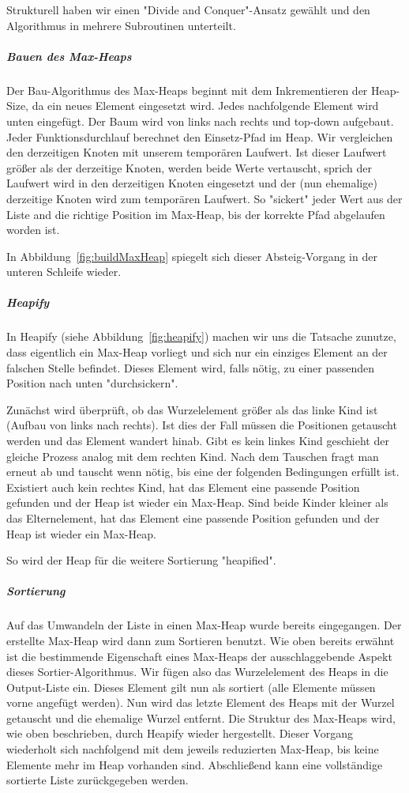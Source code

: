 Strukturell haben wir einen "Divide and Conquer"-Ansatz gewählt und den
Algorithmus in mehrere Subroutinen unterteilt.

\subparagraph{Bauen des Max-Heaps}
Der Bau-Algorithmus des Max-Heaps beginnt mit dem Inkrementieren der Heap-Size, da ein neues Element eingesetzt wird.
Jedes nachfolgende Element wird unten eingefügt.
Der Baum wird von links nach rechts und top-down aufgebaut.
Jeder Funktionsdurchlauf berechnet den Einsetz-Pfad im Heap.
Wir vergleichen den derzeitigen Knoten mit unserem temporären Laufwert.
Ist dieser Laufwert größer als der derzeitige Knoten, werden beide Werte vertauscht, sprich der Laufwert wird in den derzeitigen Knoten eingesetzt und der (nun ehemalige) derzeitige Knoten wird zum temporären Laufwert.
So "sickert" jeder Wert aus der Liste and die richtige Position im Max-Heap, bis der korrekte Pfad abgelaufen worden ist.

In Abbildung~\ref{fig:buildMaxHeap} spiegelt sich dieser Absteig-Vorgang
in der unteren Schleife wieder.

\subparagraph{Heapify}
In Heapify (siehe Abbildung~\ref{fig:heapify}) machen wir uns die
Tatsache zunutze, dass eigentlich ein
Max-Heap vorliegt und sich nur ein einziges Element an der falschen
Stelle befindet.
Dieses Element wird, falls nötig, zu einer passenden Position nach unten
"durchsickern".

Zunächst wird überprüft, ob das Wurzelelement größer als das linke Kind
ist (Aufbau von links nach rechts).
Ist dies der Fall müssen die Positionen getauscht werden und das Element
wandert hinab.
Gibt es kein linkes Kind geschieht der gleiche Prozess analog mit dem
rechten Kind.
Nach dem Tauschen fragt man erneut ab und tauscht wenn nötig, bis eine
der folgenden Bedingungen erfüllt ist.
Existiert auch kein rechtes Kind, hat das Element eine passende Position
gefunden und der Heap ist wieder ein Max-Heap.
Sind beide Kinder kleiner als das Elternelement, hat das Element eine
passende Position gefunden und der Heap ist wieder ein Max-Heap.

So wird der Heap für die weitere Sortierung "heapified".

\subparagraph{Sortierung}
Auf das Umwandeln der Liste in einen Max-Heap wurde bereits eingegangen.
Der erstellte Max-Heap wird dann zum Sortieren benutzt.
Wie oben bereits erwähnt ist die bestimmende Eigenschaft eines Max-Heaps
der ausschlaggebende Aspekt dieses Sortier-Algorithmus.
Wir fügen also das Wurzelelement des Heaps in die Output-Liste ein.
Dieses Element gilt nun als sortiert (alle Elemente müssen vorne angefügt
werden).
Nun wird das letzte Element des Heaps mit der Wurzel getauscht und die
ehemalige Wurzel entfernt.
Die Struktur des Max-Heaps wird, wie oben beschrieben, durch Heapify
wieder hergestellt.
Dieser Vorgang wiederholt sich nachfolgend mit dem jeweils reduzierten
Max-Heap, bis keine Elemente mehr im Heap vorhanden sind.
Abschließend kann eine vollständige sortierte Liste zurückgegeben werden.

